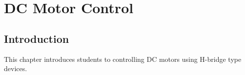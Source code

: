 \chapter{DC Motor Control}

\section{Introduction}
This chapter introduces students to controlling DC motors using H-bridge type devices.
